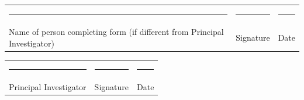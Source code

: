 \documentclass[a4paper,10pt]{article}
\begin{document}
\begin{enumerate}
 \end{enumerate}

 \begin{tabular}{p{4cm}p{4cm}p{4cm}}
    \rule{10em}{.3pt} & \rule{10em}{.3pt} & \rule{10em}{.3pt} \\
     Name of person completing form (if different from Principal Investigator) & Signature &  Date \\
\end{tabular}

\vspace{0.6cm}

 \begin{tabular}{p{4cm}p{4cm}p{4cm}}
    \rule{10em}{.3pt} & \rule{10em}{.3pt} & \rule{10em}{.3pt} \\
     Principal Investigator & Signature &  Date \\
 \end{tabular}
\end{document}

